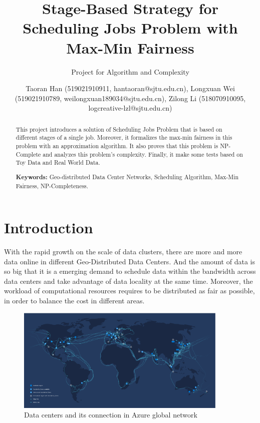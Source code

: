\documentclass{llncs}
\title{Stage-Based Strategy for Scheduling Jobs Problem with Max-Min Fairness}
\subtitle{Project for Algorithm and Complexity \vspace{-3mm}}
\author{Taoran Han (519021910911, hantaoran@sjtu.edu.cn), Longxuan Wei (519021910789, weilongxuan189034@sjtu.edu.cn), Zilong Li (518070910095, logcreative-lzl@sjtu.edu.cn)}
\institute{Department of Computer Science, \\ Shanghai Jiao Tong University, Shanghai, China}
\begin{document}



\maketitle
\begin{abstract}\vspace{-5mm}
This project introduces a solution of Scheduling Jobs Problem that is based on different stages of a single job. Moreover, it formalizes the max-min fairness in this problem with an approximation algorithm. It also proves that this problem is NP-Complete and analyzes this problem's complexity. Finally, it make some tests based on Toy Data and Real World Data.

\textbf{Keywords:} Geo-distributed Data Center Networks, Scheduling Algorithm, Max-Min Fairness, NP-Completeness.
\end{abstract}

\section{Introduction}

With the rapid growth on the scale of data clusters, there are more and more data online in different Geo-Distributed Data Centers. And the amount of data is so big that it is a emerging demand to schedule data within the bandwidth across data centers and take advantage of data locality at the same time. Moreover, the workload of computational resources requires to be distributed as fair as possible, in order to balance the cost in different areas.

\begin{figure}[h]
    \centering
    \includegraphics[width=0.9\textwidth]{img/network.png}
    \caption{Data centers and its connection in Azure global network\cite{azure}}
    \label{fig:azure}
\end{figure}
\end{document}
